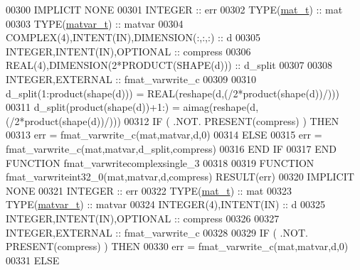 \begin{DoxyCode}
00300 \textcolor{keywordtype}{IMPLICIT NONE}
00301     \textcolor{keywordtype}{INTEGER}                                :: err
00302     \textcolor{keywordtype}{TYPE}(\hyperlink{group___m_a_t_gab0fc888f5a5d79943b16284b1f91c2e8}{mat\_t})                            :: mat
00303     \textcolor{keywordtype}{TYPE}(\hyperlink{group___m_a_t_structmatvar__t}{matvar\_t})                         :: matvar
00304     \textcolor{keywordtype}{COMPLEX(4)},\textcolor{keywordtype}{INTENT(IN)},\textcolor{keywordtype}{DIMENSION(:,:,:)} :: d
00305     \textcolor{keywordtype}{INTEGER},\textcolor{keywordtype}{INTENT(IN)},\textcolor{keywordtype}{OPTIONAL}            :: compress
00306     \textcolor{keywordtype}{REAL(4)},\textcolor{keywordtype}{DIMENSION(2*PRODUCT(SHAPE(d)))} :: d\_split
00307 
00308     \textcolor{keywordtype}{INTEGER},\textcolor{keywordtype}{EXTERNAL}                       :: fmat\_varwrite\_c
00309 
00310     d\_split(1:product(shape(d)))  = \textcolor{keywordtype}{REAL}(reshape(d,(/2*product(shape(d))/)))
00311     d\_split(product(shape(d))+1:) = aimag(reshape(d,(/2*product(shape(d))/)))
00312     \textcolor{keywordflow}{IF} ( .NOT. \textcolor{keyword}{PRESENT}(compress) ) \textcolor{keywordflow}{THEN}
00313         err = fmat\_varwrite\_c(mat,matvar,d,0)
00314     \textcolor{keywordflow}{ELSE}
00315         err = fmat\_varwrite\_c(mat,matvar,d\_split,compress)
00316 \textcolor{keywordflow}{    END IF}
00317 \textcolor{keyword}{END FUNCTION }fmat\_varwritecomplexsingle\_3
00318 
00319 \textcolor{keyword}{FUNCTION }fmat\_varwriteint32\_0(mat,matvar,d,compress) \textcolor{keyword}{RESULT}(err)
00320 \textcolor{keywordtype}{IMPLICIT NONE}
00321     \textcolor{keywordtype}{INTEGER}                                  :: err
00322     \textcolor{keywordtype}{TYPE}(\hyperlink{group___m_a_t_gab0fc888f5a5d79943b16284b1f91c2e8}{mat\_t})                              :: mat
00323     \textcolor{keywordtype}{TYPE}(\hyperlink{group___m_a_t_structmatvar__t}{matvar\_t})                           :: matvar
00324     \textcolor{keywordtype}{INTEGER(4)},\textcolor{keywordtype}{INTENT(IN)}                    :: d
00325     \textcolor{keywordtype}{INTEGER},\textcolor{keywordtype}{INTENT(IN)},\textcolor{keywordtype}{OPTIONAL}              :: compress
00326 
00327     \textcolor{keywordtype}{INTEGER},\textcolor{keywordtype}{EXTERNAL}                         :: fmat\_varwrite\_c
00328 
00329     \textcolor{keywordflow}{IF} ( .NOT. \textcolor{keyword}{PRESENT}(compress) ) \textcolor{keywordflow}{THEN}
00330         err = fmat\_varwrite\_c(mat,matvar,d,0)
00331     \textcolor{keywordflow}{ELSE}

\end{DoxyCode}
